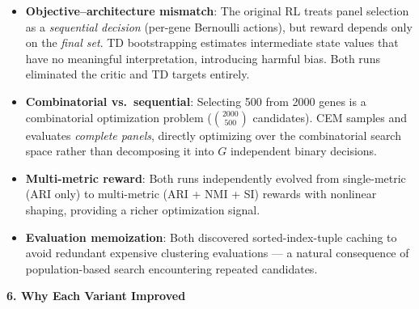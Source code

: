 \documentclass[8pt]{article}
\begin{document}
\begin{tcolorbox}[
    title={\textbf{Shared insight}: RL $\to$ CEM paradigm shift (independently discovered by both runs)},
    colback=white, colframe=black!60, fonttitle=\small\bfseries,
    boxrule=0.5pt, arc=2pt, left=6pt, right=6pt, top=3pt, bottom=3pt
]
\small
\begin{itemize}[leftmargin=1em, itemsep=2pt]
    \item \textbf{Objective--architecture mismatch}: The original RL treats panel selection as a \emph{sequential decision} (per-gene Bernoulli actions), but reward depends only on the \emph{final set}. TD bootstrapping estimates intermediate state values that have no meaningful interpretation, introducing harmful bias. Both runs eliminated the critic and TD targets entirely.

    \item \textbf{Combinatorial vs.\ sequential}: Selecting 500 from 2000 genes is a combinatorial optimization problem ($\binom{2000}{500}$ candidates). CEM samples and evaluates \emph{complete panels}, directly optimizing over the combinatorial search space rather than decomposing it into $G$ independent binary decisions.

    \item \textbf{Multi-metric reward}: Both runs independently evolved from single-metric (ARI only) to multi-metric (ARI + NMI + SI) rewards with nonlinear shaping, providing a richer optimization signal.

    \item \textbf{Evaluation memoization}: Both discovered sorted-index-tuple caching to avoid redundant expensive clustering evaluations --- a natural consequence of population-based search encountering repeated candidates.
\end{itemize}
\end{tcolorbox}

\vspace{4pt}

{\large\bfseries 6. Why Each Variant Improved}

\vspace{3pt}
\end{document}
